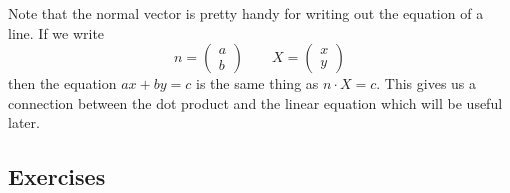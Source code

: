 \documentclass[elementsmain.tex]{subfiles}
\begin{document}
Note that the normal vector is pretty handy for writing out the equation of a line. If we write 
\[
n = \begin{pmatrix} a \\ b \end{pmatrix} \qquad X = \begin{pmatrix} x \\ y \end{pmatrix}
\]
then the equation $ax+by=c$ is the same thing as $n\cdot X = c$. This gives us a connection between the dot product and the linear equation which will be useful later.

\clearpage

\subsection*{Exercises}




\clearpage
\end{document}
